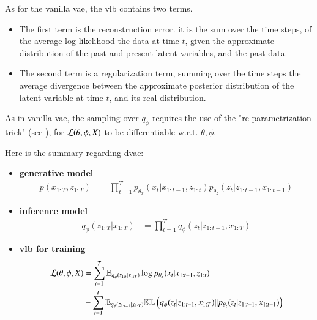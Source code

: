 As for the vanilla \gls{vae}, the \gls{vlb} contains two terms.

\begin{itemize}
    \item The first term is the reconstruction error. it is the sum over the time steps, of the average log likelihood the data at time $t$, given the approximate distribution of the past and present latent variables, and the past data.
    \item The second term is a regularization term, summing over the time steps the average divergence between the approximate posterior distribution of the latent variable at time $t$, and its real distribution.
\end{itemize}

As in vanilla \gls{vae}, the sampling over $q_\phi$ requires the use of the "re parametrization trick" (see \cite{kingma_introduction_2019}), for $\mathcal{L}(\theta, \phi, X)$ to be differentiable w.r.t. $\theta, \phi$.

Here is the summary regarding \gls{dvae}:

\begin{tcolorbox}[colback=blue!5!white,colframe=black!75!black,title=General Dynamical VAEs]
\begin{itemize}
    \item \textbf{generative model}
    \begin{align}
        \label{gen_model_dvae}
        p(x_{1:T}, z_{1:T}) &= \prod_{t=1}^T p_{\theta_x} (x_t \vert x_{1:t-1}, z_{1:t}) p_{\theta_z}(z_t \vert z_{1:t-1}, x_{1:t-1})
    \end{align}
    \item \textbf{inference model}
    \begin{align}
        \label{inf_model_dvae}
        q_{\phi}(z_{1:T} \vert x_{1:T}) &= \prod_{t=1}^T q_\phi(z_t \vert z_{1:t-1}, x_{1:T})
    \end{align}
    \item \textbf{\gls{vlb} for training}
    \begin{align}
        \label{vlb_dvae}
        \begin{split}
         \mathcal{L}(\theta, \phi, X) &= \sum_{t=1}^T \mathbb{E}_{q_\phi(z_{1:t} \vert x_{1:T})} \log{p_{\theta_x}(x_t \vert x_{1:t-1}, z_{1:t})} \\ &- \sum_{t=1}^T \mathbb{E}_{q_\phi(z_{1:t-1} \vert x_{1:T})} \mathbb{KL}\left( q_\phi(z_t \vert z_{1:t-1}, x_{1:T}) \vert\vert p_{\theta_z}(z_t \vert z_{1:t-1}, x_{1:t-1}) \right)
         \end{split}
    \end{align}
\end{itemize}
\end{tcolorbox}